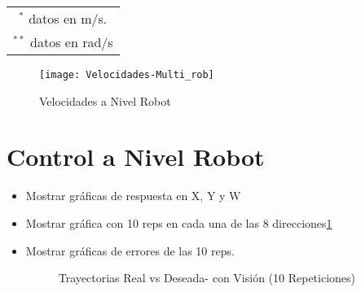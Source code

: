 {\begin{table}
\begin{tabular}{l|c c }
\hline
\multicolumn{3}{c}{\(^{*}\) datos en m/s.} \\
\multicolumn{3}{c}{\(^{**}\) datos en rad/s}
\end{tabular}
\label{table:prom_std_vels_rob}
\end{table}



\begin{figure}
	\centering
		\texttt{[image: Velocidades-Multi\_rob]}
	\caption{Velocidades a Nivel Robot}
	\label{fig:vels_niv_rob}
\end{figure}


\section{Control a Nivel Robot}



\begin{itemize}
	\item Mostrar gráficas de respuesta en X, Y y W
	\item Mostrar gráfica con 10 reps en cada una de las 8 direcciones\ref{fig:vels_niv_rob} 
	\item Mostrar gráficas de errores de las 10 reps.


\begin{figure}
	\centering
	\caption{Trayectorias Real vs Deseada- con Visión (10 Repeticiones)}
	\label{fig:trays_10reps}
\end{figure}



\end{itemize}}
